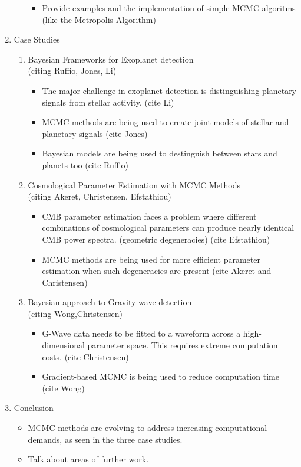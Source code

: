\documentclass[12pt]{article}
\begin{document}
\begin{enumerate}
\begin{enumerate}
\begin{itemize}
      \item Provide examples and the implementation of simple MCMC algoritms (like the Metropolis Algorithm)
    \end{itemize}
  \end{enumerate}
  \item Case Studies
  \begin{enumerate}
    \item Bayesian Frameworks for Exoplanet detection \\ (citing Ruffio, Jones, Li)
    \begin{itemize}
      \item The major challenge in exoplanet detection is distinguishing planetary signals from stellar activity. (cite Li)
      \item MCMC methods are being used to create joint models of stellar and planetary signals (cite Jones)
      \item Bayesian models are being used to destinguish between stars and planets too (cite Ruffio)
    \end{itemize}
    \item Cosmological Parameter Estimation with MCMC Methods \\ (citing Akeret, Christensen, Efstathiou)
    \begin{itemize}
      \item CMB parameter estimation faces a problem where different combinations of cosmological parameters can produce nearly identical CMB power spectra. (geometric degeneracies) (cite Efstathiou)
      \item MCMC methods are being used for more efficient parameter estimation when such degeneracies are present (cite Akeret and Christensen)
    \end{itemize}
    \item Bayesian approach to Gravity wave detection \\ (citing Wong,Christensen)
    \begin{itemize}
      \item G-Wave data needs to be fitted to a waveform across a high-dimensional parameter space. This requires extreme computation costs. (cite Christensen)
      \item Gradient-based MCMC is being used to reduce computation time (cite Wong)
    \end{itemize}
  \end{enumerate}
  \item Conclusion
  \begin{itemize}
    \item MCMC methods are evolving to address increasing computational demands, as seen in the three case studies.
    \item Talk about areas of further work.
  \end{itemize}
\end{enumerate}
\end{document}
